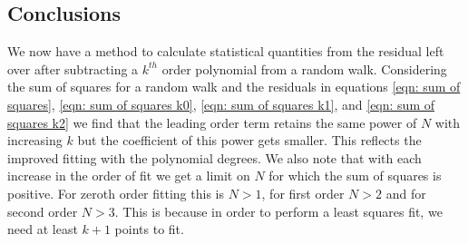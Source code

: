 \documentclass[../full_thesis/full_thesis.tex]{subfiles}
\begin{document}
\begin{subappendices}
\subsection{Conclusions}
\label{sec: appendix conclusions}
We now have a method to calculate statistical quantities from the residual
left over after subtracting a $k^{th}$ order polynomial from a random walk.
Considering the sum of squares for a random walk and the residuals in equations
\eqref{eqn: sum of squares}, \eqref{eqn: sum of squares k0},
\eqref{eqn: sum of squares k1}, and \eqref{eqn: sum of squares k2} we find that
the leading order term retains the same
power of $N$ with increasing $k$ but the coefficient of this power gets
smaller. This reflects the improved fitting with the polynomial degrees. We
also note that with each increase in the order of fit we get a limit
on $N$ for which the sum of squares is positive. For zeroth order fitting this
is $N>1$, for first order $N>2$ and for second order $N>3$. This is because in
order to perform a least squares fit, we need at least $k+1$ points to fit.

\end{subappendices}


\biblio
\end{document}
